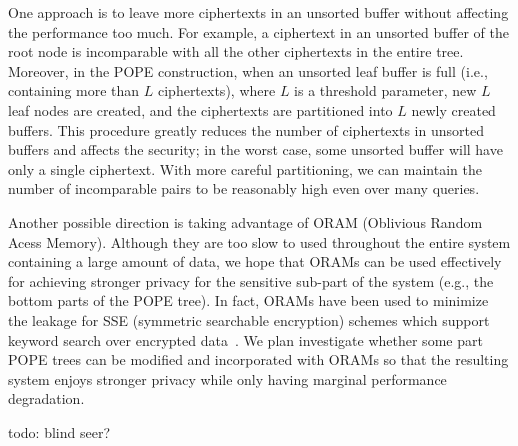 One approach is to leave more ciphertexts in an unsorted buffer without
affecting the performance too much. For example, a ciphertext in an unsorted
buffer of the root node is incomparable with all the other ciphertexts in the
entire tree.  Moreover, in the POPE construction, when an unsorted leaf buffer
is full (i.e.,  containing more than $L$ ciphertexts), where $L$ is a threshold
parameter, new $L$ leaf nodes are created, and the ciphertexts are partitioned
into $L$ newly created buffers. This procedure greatly reduces the number of
ciphertexts in unsorted buffers and affects the security; in the worst case,
some unsorted buffer will have only a single ciphertext. With more careful
partitioning, we can maintain the number of incomparable pairs to be reasonably
high even over many queries. 


Another possible direction is taking advantage of ORAM (Oblivious Random Acess
Memory). Although they are too slow to used throughout the entire system
containing a large amount of data, we hope that ORAMs can be used effectively
for achieving stronger privacy for the sensitive sub-part of the system (e.g.,
the bottom parts of the POPE tree).  In fact, ORAMs have been used to minimize
the leakage for SSE (symmetric searchable encryption) schemes which support
keyword search over encrypted data~\cite{NDSS:StePapShi14,C:GarMohPap16}. We
plan investigate whether some part POPE trees can be modified and incorporated
with ORAMs so that the resulting system enjoys stronger privacy while only
having marginal performance degradation.  


todo: blind seer?
